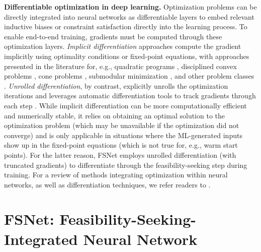 \documentclass{article}
\begin{document}
\textbf{Differentiable optimization in deep learning.} 
Optimization problems can be directly integrated into neural networks as differentiable layers to embed relevant inductive biases or constraint satisfaction directly into the learning process. 
To enable end-to-end training, gradients must be computed through these optimization layers. 
\textit{Implicit differentiation} approaches compute the gradient implicitly using optimality conditions or fixed-point equations, with approaches presented in the literature for, e.g., quadratic programs \cite{amos2017optnet, magoon2024differentiation}, disciplined convex problems \cite{cvxpylayers2019}, cone problems \cite{donti2020enforcing, agrawal2019differentiating}, submodular minimization \cite{djolonga2017differentiable}, and other problem classes \cite{gould2021deep}. 
\textit{Unrolled differentiation}, by contrast, explicitly unrolls the optimization iterations and leverages automatic differentiation tools to track gradients through each step \cite{monga2021algorithm, kotary2023backpropagation, shaban2019truncated, scieur2022curse}.
While implicit differentiation can be more computationally efficient and numerically stable, it relies on obtaining an optimal solution to the optimization problem (which may be unavailable if the optimization did not converge) and is only applicable 
in situations where the ML-generated inputs show up in the fixed-point equations (which is not true for, e.g., warm start points).
For the latter reason, FSNet employs unrolled differentiation (with truncated gradients) 
to differentiate through the feasibility-seeking step during training. 
For a review of methods integrating optimization within neural networks, as well as differentiation techniques, we refer readers to \cite{mandi2024decision, blondel2022efficient}.

\section{FSNet: Feasibility-Seeking-Integrated Neural Network}
\end{document}
